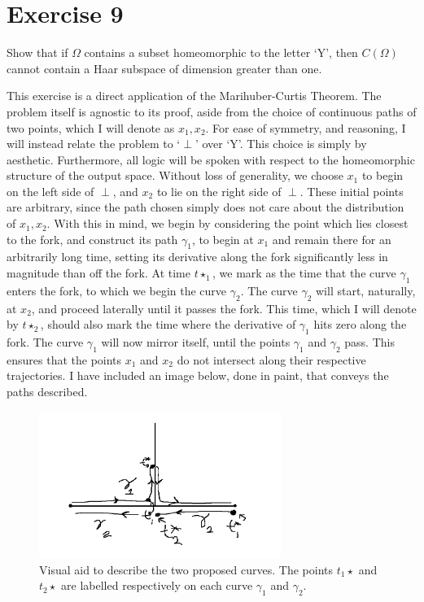 \section{Exercise 9}
Show that if $\Omega$ contains a subset homeomorphic to the letter `Y', then $C(\Omega)$ cannot contain a Haar subspace of dimension greater than one.
\partbreak
\begin{solution}

    This exercise is a direct application of the Marihuber-Curtis Theorem. The problem itself is agnostic to its proof, aside from the choice of continuous paths of two points, which I will denote as $x_1, x_2$. For ease of symmetry, and reasoning, I will instead relate the problem to `$\perp$' over `Y'. This choice is simply by aesthetic. Furthermore, all logic will be spoken with respect to the homeomorphic structure of the output space. Without loss of generality, we choose $x_1$ to begin on the left side of $\perp$, and $x_2$ to lie on the right side of $\perp$. These initial points are arbitrary, since the path chosen simply does not care about the distribution of $x_1, x_2$. With this in mind, we begin by considering the point which lies closest to the fork, and construct its path $\gamma_1$, to begin at $x_1$ and remain there for an arbitrarily long time, setting its derivative along the fork significantly less in magnitude than off the fork. At time $t\star_1$, we mark as the time that the curve $\gamma_1$ enters the fork, to which we begin the curve $\gamma_2$. The curve $\gamma_2$ will start, naturally, at $x_2$, and proceed laterally until it passes the fork. This time, which I will denote by $t\star_2$, should also mark the time where the derivative of $\gamma_1$ hits zero along the fork. The curve $\gamma_1$ will now mirror itself, until the points $\gamma_1$ and $\gamma_2$ pass. This ensures that the points $x_1$ and $x_2$ do not intersect along their respective trajectories. I have included an image below, done in paint, that conveys the paths described.
\end{solution}

\begin{figure}[!ht]
    \centering
    \includegraphics[width = 0.7\textwidth]{Figures/Exercise 9.png}
    \caption{Visual aid to describe the two proposed curves. The points $t_1\star$ and $t_2\star$ are labelled respectively on each curve $\gamma_1$ and $\gamma_2$.}
\end{figure}


